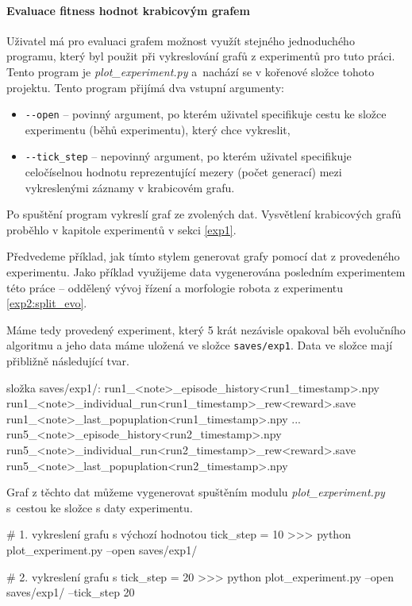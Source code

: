 \paragraph{Evaluace fitness hodnot krabicovým grafem}
Uživatel má pro evaluaci grafem možnost využít stejného jednoduchého programu,
který byl použit při vykreslování grafů z experimentů pro tuto práci. Tento
program je \emph{plot\_experiment.py} a~nachází se v kořenové složce
tohoto projektu. Tento program přijímá dva vstupní argumenty: 
\begin{itemize}
    \item \texttt{-{}-open} -- povinný argument, po kterém uživatel specifikuje
        cestu ke složce experimentu (běhů experimentu), který chce vykreslit,
    \item \texttt{-{}-tick\_step} -- nepovinný argument, po kterém uživatel specifikuje
        celočíselnou hodnotu reprezentující mezery (počet generací) mezi
        vykreslenými záznamy v krabicovém grafu.
\end{itemize}
Po spuštění program vykreslí graf ze zvolených dat. Vysvětlení krabicových
grafů proběhlo v kapitole experimentů v sekci \ref{exp1}.

Předvedeme příklad, jak tímto stylem generovat grafy pomocí dat z provedeného
experimentu. Jako příklad využijeme data vygenerována posledním experimentem
této práce -- oddělený vývoj řízení a morfologie robota z experimentu
\ref{exp2:split_evo}. 

Máme tedy provedený experiment, který 5 krát nezávisle opakoval běh evolučního
algoritmu a jeho data máme uložená ve složce \texttt{saves/exp1}. Data ve
složce mají přibližně následující tvar.
\begin{code}
složka saves/exp1/:
    run1_<note>_episode_history<run1_timestamp>.npy
    run1_<note>_individual_run<run1_timestamp>_rew<reward>.save
    run1_<note>_last_popuplation<run1_timestamp>.npy
    ...
    run5_<note>_episode_history<run2_timestamp>.npy
    run5_<note>_individual_run<run2_timestamp>_rew<reward>.save
    run5_<note>_last_popuplation<run2_timestamp>.npy
\end{code}
Graf z těchto dat můžeme vygenerovat spuštěním modulu
\emph{plot\_experiment.py} s~cestou ke složce s daty experimentu.

\begin{code}
# 1. vykreslení grafu s výchozí hodnotou tick_step = 10
>>> python plot_experiment.py --open saves/exp1/ 

# 2. vykreslení grafu s tick_step = 20
>>> python plot_experiment.py --open saves/exp1/ --tick_step 20
\end{code}

